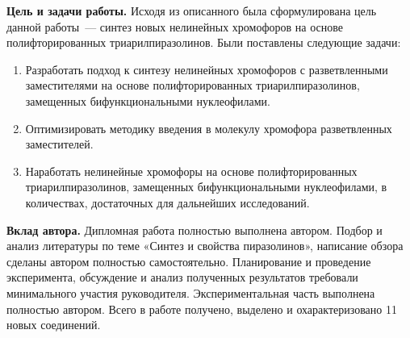 \textbf{Цель и задачи работы.}
Исходя из описанного была сформулирована цель данной работы~--- синтез новых нелинейных хромофоров на основе полифторированных триарилпиразолинов.
Были поставлены следующие задачи:
\begin{enumerate}
    \item Разработать подход к синтезу нелинейных хромофоров с разветвленными заместителями на основе полифторированных триарилпиразолинов, замещенных бифункциональными нуклеофилами.
    \item Оптимизировать методику введения в молекулу хромофора разветвленных заместителей.
    \item Наработать нелинейные хромофоры на основе полифторированных триарилпиразолинов, замещенных бифункциональными нуклеофилами, в количествах, достаточных для дальнейших исследований.
\end{enumerate}

\textbf{Вклад автора.}
Дипломная работа полностью выполнена автором.
Подбор и анализ литературы по теме «Синтез и свойства пиразолинов», написание обзора сделаны автором полностью самостоятельно.
Планирование и проведение эксперимента, обсуждение и анализ полученных результатов требовали минимального участия руководителя.
Экспериментальная часть выполнена полностью автором.
Всего в работе получено, выделено и охарактеризовано 11 новых соединений.